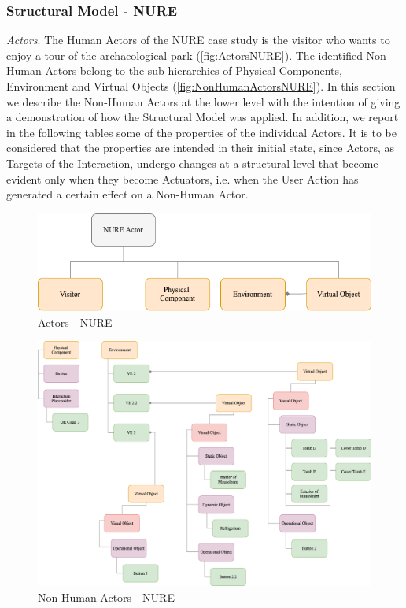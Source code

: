\subsubsection*{Structural Model - NURE}
\emph{Actors}. The Human Actors of the NURE case study is the visitor who wants to enjoy a tour of the archaeological park (\autoref{fig:ActorsNURE}). The identified Non-Human Actors belong to the sub-hierarchies of Physical Components, Environment and Virtual Objects (\autoref{fig:NonHumanActorsNURE}). In this section we describe the Non-Human Actors at the lower level with the intention of giving a demonstration of how the Structural Model was applied. In addition, we report in the following tables some of the properties of the individual Actors. It is to be considered that the properties are intended in their initial state, since Actors, as Targets of the Interaction, undergo changes at a structural level that become evident only when they become Actuators, i.e. when the User Action has generated a certain effect on a Non-Human Actor.

\begin{figure}[htbp]
	\centering
	\includegraphics[width=14cm]{Figures/Conceptual Model/SM_NURE1.png}
	\caption{Actors - NURE}
	\label{fig:ActorsNURE}
\end{figure}

\begin{figure}[htbp]
	\centering
	\includegraphics[width=14cm]{Figures/Conceptual Model/SM_NURE2.png}
	\caption{Non-Human Actors - NURE}
	\label{fig:NonHumanActorsNURE}
\end{figure}

